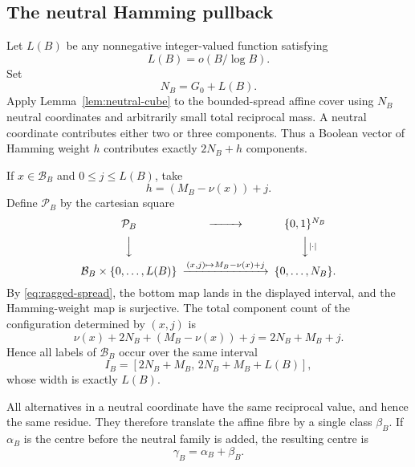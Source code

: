 \subsection{The neutral Hamming pullback}

Let $L(B)$ be any nonnegative integer-valued function satisfying
\begin{equation}\label{eq:startup-subscale}
L(B)=o(B/\log B).
\end{equation}
Set
\[
N_B=G_0+L(B).
\]
Apply Lemma~\ref{lem:neutral-cube} to the bounded-spread affine cover using $N_B$ neutral coordinates and arbitrarily small total reciprocal mass.  A neutral coordinate contributes either two or three components.  Thus a Boolean vector of Hamming weight $h$ contributes exactly $2N_B+h$ components.

If $x\in\mathcal B_B$ and $0\le j\le L(B)$, take
\begin{equation}\label{eq:hamming-match}
h=(M_B-\nu(x))+j.
\end{equation}
Define $\mathcal P_B$ by the cartesian square
\begin{equation}\label{eq:hamming-pullback}
\begin{CD}
\mathcal P_B @>>> \{0,1\}^{N_B}\\
@VVV @VV{|\cdot|}V\\
\mathcal B_B\times\{0,\ldots,L(B)\}
@>{(x,j)\mapsto M_B-\nu(x)+j}>>
\{0,\ldots,N_B\}.
\end{CD}
\end{equation}
By \eqref{eq:ragged-spread}, the bottom map lands in the displayed interval, and the Hamming-weight map is surjective.  The total component count of the configuration determined by $(x,j)$ is
\[
\nu(x)+2N_B+(M_B-\nu(x))+j
=2N_B+M_B+j.
\]
Hence all labels of $\mathcal B_B$ occur over the same interval
\begin{equation}\label{eq:common-count-interval}
I_B=[2N_B+M_B,\,2N_B+M_B+L(B)],
\end{equation}
whose width is exactly $L(B)$.

All alternatives in a neutral coordinate have the same reciprocal value, and hence the same residue.  They therefore translate the affine fibre by a single class $\beta_B$.  If $\alpha_B$ is the centre before the neutral family is added, the resulting centre is
\begin{equation}\label{eq:full-centre}
\gamma_B=\alpha_B+\beta_B.
\end{equation}

